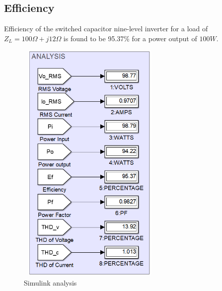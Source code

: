 \documentclass[12pt,a4paper]{report}
\begin{document}
\subsection{Efficiency}
Efficiency of the switched capacitor nine-level inverter for a load of $Z_L = 100\Omega + j12\Omega$ is found to be 95.37\% for a power output of $100W$.\\
\begin{figure}[H]
	\begin{center}
		\includegraphics[width=7cm,height=12cm]{figures/SIMULINKANALYSIS.png}
	\end{center}
	\caption{Simulink analysis}
	\label{siman}
\end{figure}
\end{document}
